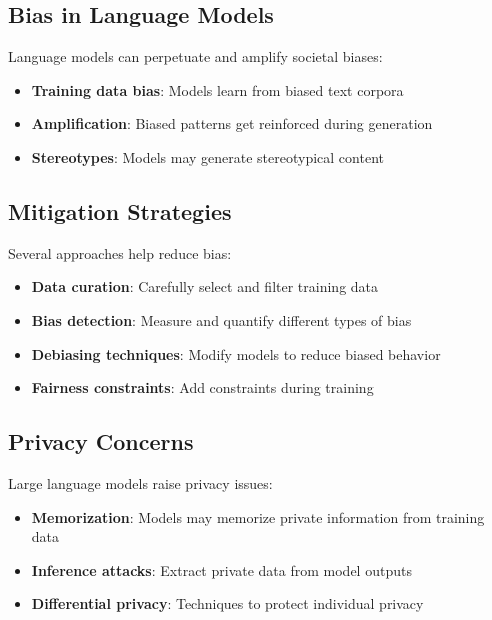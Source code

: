 \documentclass[11pt,a4paper]{article}
\theoremstyle{definition}
\theoremstyle{plain}
\theoremstyle{remark}
\begin{document}
\subsection{Bias in Language Models}

Language models can perpetuate and amplify societal biases:

\begin{itemize}
    \item \textbf{Training data bias}: Models learn from biased text corpora
    \item \textbf{Amplification}: Biased patterns get reinforced during generation
    \item \textbf{Stereotypes}: Models may generate stereotypical content
\end{itemize}

\subsection{Mitigation Strategies}

Several approaches help reduce bias:

\begin{itemize}
    \item \textbf{Data curation}: Carefully select and filter training data
    \item \textbf{Bias detection}: Measure and quantify different types of bias
    \item \textbf{Debiasing techniques}: Modify models to reduce biased behavior
    \item \textbf{Fairness constraints}: Add constraints during training
\end{itemize}

\subsection{Privacy Concerns}

Large language models raise privacy issues:

\begin{itemize}
    \item \textbf{Memorization}: Models may memorize private information from training data
    \item \textbf{Inference attacks}: Extract private data from model outputs
    \item \textbf{Differential privacy}: Techniques to protect individual privacy
\end{itemize}
\end{document}
